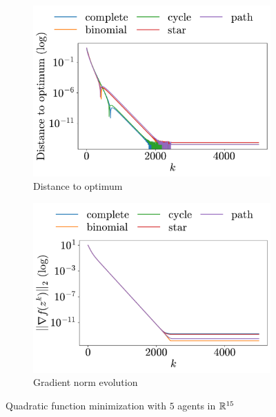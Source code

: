\documentclass[a4paper,11pt,oneside]{book}
\begin{document}
\begin{figure}[h!]
      \centering
      \begin{subfigure}[h]{0.42\linewidth}
            \centering
            \includegraphics[width=\linewidth]{./figs/quadratic/5_15/distance.pdf} 
            \caption{Distance to optimum}
      \end{subfigure}
      \hfill
      \begin{subfigure}[h]{0.42\linewidth}
            \centering
            \includegraphics[width=\linewidth]{./figs/quadratic/5_15/gradient.pdf} 
            \caption{Gradient norm evolution}
      \end{subfigure}
      \caption{Quadratic function minimization with $5$ agents in ${\mathbb{R}}^{15}$}
      \label{fig:quadratic_5_15}
\end{figure}
\end{document}
